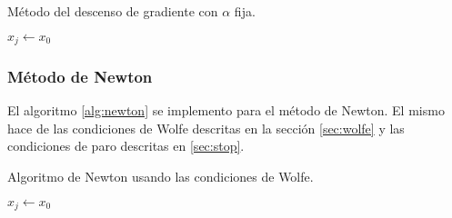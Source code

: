 \begin{algorithm}
    \caption{Método del descenso de gradiente con $\alpha$ fija.\label{alg:gradient} }
    $x_j \gets x_0$\\
\end{algorithm}

\subsubsection{Método de Newton}

El algoritmo \ref{alg:newton} se implemento para el método de Newton. El mismo hace de las condiciones de Wolfe descritas en la sección \ref{sec:wolfe} y las condiciones de paro descritas en \ref{sec:stop}.

\begin{algorithm}
    \caption{Algoritmo de Newton usando las condiciones de Wolfe.\label{alg:newton}}
    $x_j \gets x_0$\\
\end{algorithm}